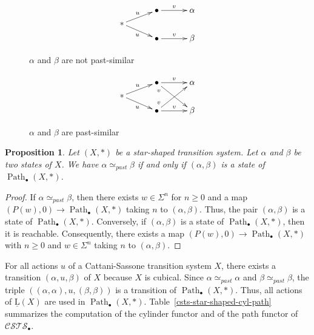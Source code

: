 \documentclass[a4paper,12pt]{amsart}
\newtheorem{prop}[thm]{Proposition}
\begin{document}
\begin{figure}
\[
\xymatrix@C=3em@R=0.5em
{
& \bullet {\ar@{->}[r]^-{{v}}} & \alpha\\
{*} \ar@{->}[ru]^-{u} \ar@{->}[rd]_-{u}\\
& \bullet {\ar@{->}[r]^-{{v}}} & \beta \\
}
\]
\caption{$\alpha$ and $\beta$ are not past-similar}
\label{not-past-similar}
\end{figure}

\begin{figure}
\[
\xymatrix@C=3em@R=0.5em
{
& \bullet {\ar@{->}[r]^-{{v}}}\ar@{->}[rdd]_-/-18pt/{v} & \alpha\\
{*} \ar@{->}[ru]^-{u} \ar@{->}[rd]_-{u}\\
& \bullet {\ar@{->}[r]^-{{v}}}\ar@{->}[ruu]^-/-18pt/{v} & \beta \\
}
\]
\caption{$\alpha$ and $\beta$ are past-similar}
\label{past-similar}
\end{figure}

\begin{prop} \label{pastsimilar-pathsimilar} Let $(X,*)$ be a star-shaped
transition system. Let $\alpha$ and $\beta$ be two states of $X$.  We
have $\alpha \simeq_{past} \beta$ if and only if $(\alpha,\beta)$ is a
state of $\operatorname{{Path}}_\bullet(X,*)$. \end{prop}

\begin{proof} If $\alpha \simeq_{past} \beta$, then there exists $w\in
\Sigma^n$ for $n{\geqslant} 0$ and a map $(P(w),0) \to \operatorname{{Path}}_\bullet(X,*)$
taking $n$ to $(\alpha,\beta)$.  Thus, the pair $(\alpha,\beta)$ is a
state of $\operatorname{{Path}}_\bullet(X,*)$. Conversely, if $(\alpha,\beta)$ is a
state of $\operatorname{{Path}}_\bullet(X,*)$, then it is reachable. Consequently,
there exists a map $(P(w),0) \to \operatorname{{Path}}_\bullet(X,*)$ with $n{\geqslant} 0$
and $w\in \Sigma^n$ taking $n$ to $(\alpha,\beta)$.  \end{proof}

For all actions $u$ of a Cattani-Sassone transition system $X$, there
exists a transition $(\alpha,u,\beta)$ of $X$ because $X$ is
cubical. Since $\alpha \simeq_{past} \alpha$ and $\beta \simeq_{past}
\beta$, the triple $((\alpha,\alpha),u,(\beta,\beta))$ is a transition
of $\operatorname{{Path}}_\bullet(X,*)$. Thus, all actions of $\operatorname{\underline{L}}(X)$ are used in
$\operatorname{{Path}}_\bullet(X,*)$. Table~\ref{csts-star-shaped-cyl-path}
summarizes the computation of the cylinder functor and of the path
functor of ${\mathcal{C\!S\!T\!S}}_\bullet$.
\end{document}
